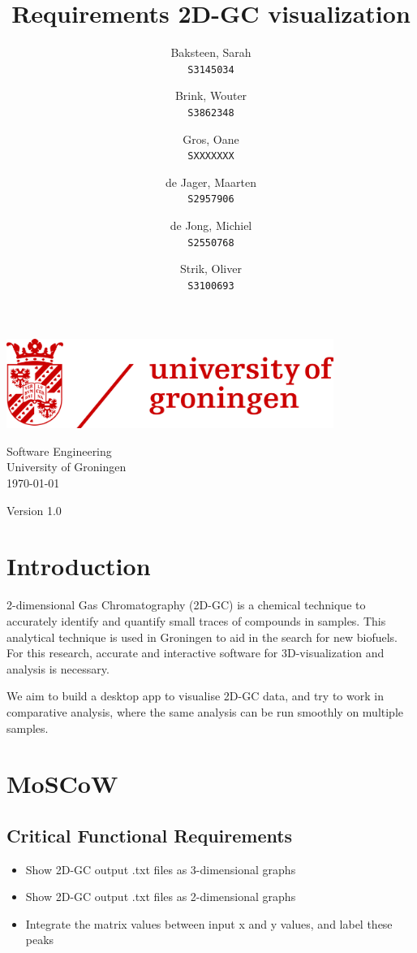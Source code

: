 \documentclass{article}
\title{Requirements 2D-GC visualization}
\author{
  Baksteen, Sarah\\
  \texttt{S3145034}
  \and
  Brink, Wouter\\
  \texttt{S3862348}
  \and
  Gros, Oane\\
  \texttt{SXXXXXXX}
  \and
  de Jager, Maarten\\
  \texttt{S2957906}
  \and
  de Jong, Michiel\\
  \texttt{S2550768}
  \and
  Strik, Oliver\\
  \texttt{S3100693}
}
\date{}
\begin{document}
\clearpage
\maketitle
\thispagestyle{empty}
\begin{center}
    \vfill
    \includegraphics[width=0.8\textwidth]{UG_logo.jpg}
    \vfill
    
    \Large
        Software Engineering \\
        University of Groningen \\
        \today \\
        \empty
        
        \vspace{1cm}
        Version 1.0
        \vspace{1cm}
\end{center}

\newpage\setcounter{page}{1}
\section{Introduction}

2-dimensional Gas Chromatography (2D-GC) is a chemical technique to accurately identify and quantify small traces of compounds in samples. This analytical technique is used in Groningen to aid in the search for new biofuels. For this research, accurate and interactive software for 3D-visualization and analysis is necessary. 

We aim to build a desktop app to visualise 2D-GC data, and try to work in comparative analysis, where the same analysis can be run smoothly on multiple samples. 

\section{MoSCoW}
\subsection*{Critical Functional Requirements}
\begin{itemize}
	\item Show 2D-GC output .txt files as 3-dimensional graphs
	\item Show 2D-GC output .txt files as 2-dimensional graphs
    \item Integrate the matrix values between input x and y values, and label these peaks
\end{itemize}
\end{document}
